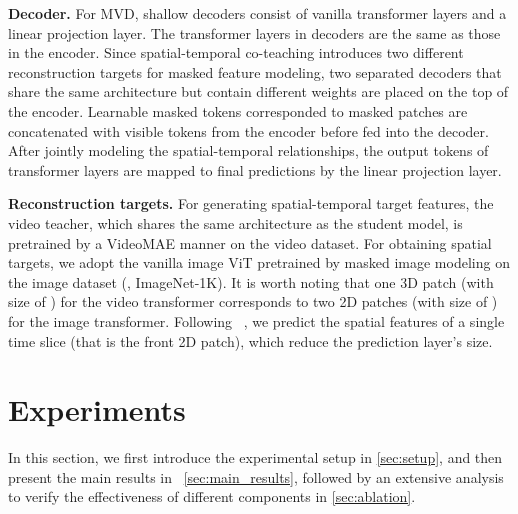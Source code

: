 \documentclass[10pt,twocolumn,letterpaper]{article}
\begin{document}
\vspace{0.05in}
\noindent \textbf{Decoder.} For MVD, shallow decoders consist of vanilla transformer layers and a linear projection layer. The transformer layers in decoders are the same as those in the encoder. Since spatial-temporal co-teaching introduces two different reconstruction targets for masked feature modeling, two separated decoders that share the same architecture but contain different  weights are placed on the top of the encoder. Learnable masked tokens corresponded to masked patches are concatenated with visible tokens from the encoder before fed into the decoder. After jointly modeling the spatial-temporal relationships, the output tokens of transformer layers are mapped to final predictions by the linear projection layer.

\vspace{0.05in}
\noindent \textbf{Reconstruction targets.} For generating spatial-temporal target features,  the video teacher, which shares the same architecture as the student model, is pretrained by a VideoMAE \cite{tong2022videomae} manner on the video dataset. For obtaining spatial targets, we adopt the vanilla image ViT pretrained by masked image modeling \cite{he2021masked} on the image dataset (\eg, ImageNet-1K). It is worth noting that one 3D patch (with size of ) for the video transformer  corresponds to two 2D patches (with size of ) for the image transformer. Following ~\cite{feichtenhofer2022masked}, we predict the spatial features of a single time slice (that is the front 2D patch), which reduce the prediction layer's size. 

\section{Experiments}
In this section, we first introduce the experimental setup in \cref{sec:setup}, and then present the main results in ~\cref{sec:main_results}, followed by an extensive analysis to verify the effectiveness of different components in  \cref{sec:ablation}.
\end{document}
